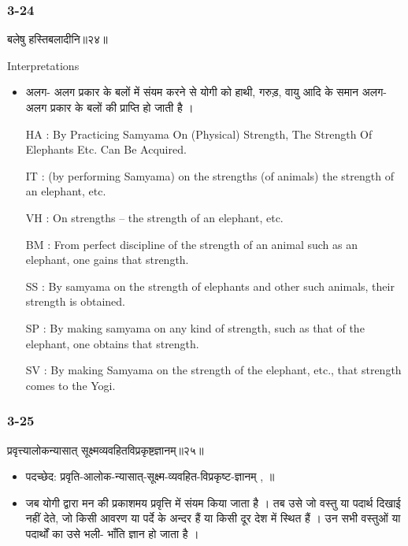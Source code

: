 \begin{frame}[fragile]\frametitle{3-24}
\begin{sanskrit}
बलेषु हस्तिबलादीनि॥२४॥
\end{sanskrit}

Interpretations
\begin{itemize}	
\item अलग- अलग प्रकार के बलों में संयम करने से योगी को हाथी, गरुड़, वायु आदि के समान अलग- अलग प्रकार के बलों की प्राप्ति हो जाती है ।
\item [HA]: By Practicing Samyama On (Physical) Strength, The Strength Of Elephants Etc. Can Be Acquired.
\item [IT]: (by performing Samyama) on the strengths (of animals) the strength of an elephant, etc.
\item [VH]: On strengths – the strength of an elephant, etc.
\item [BM]: From perfect discipline of the strength of an animal such as an elephant, one gains that strength.
\item [SS]: By samyama on the strength of elephants and other such animals, their strength is obtained.
\item [SP]: By making samyama on any kind of strength, such as that of the elephant, one obtains that strength.
\item [SV]: By making Samyama on the strength of the elephant, etc., that strength comes to the Yogi. 
\end{itemize}
\end{frame}

\begin{frame}[fragile]\frametitle{3-25}
\begin{sanskrit}
प्रवृत्त्यालोकन्यासात् सूक्ष्मव्यवहितविप्रकृष्टज्ञानम्॥२५॥
\end{sanskrit}

\begin{itemize}
\item पदच्छेद:   प्रवृति-आलोक-न्यासात्-सूक्ष्म-व्यवहित-विप्रकृष्ट-ज्ञानम् , ॥
\item जब योगी द्वारा मन की प्रकाशमय प्रवृत्ति में संयम किया जाता है । तब उसे जो वस्तु या पदार्थ दिखाई नहीं देते, जो किसी आवरण या पर्दे के अन्दर हैं या किसी दूर देश में स्थित हैं । उन सभी वस्तुओं या पदार्थों का उसे भली- भाँति ज्ञान हो जाता है ।
\end{itemize}
\end{frame}

